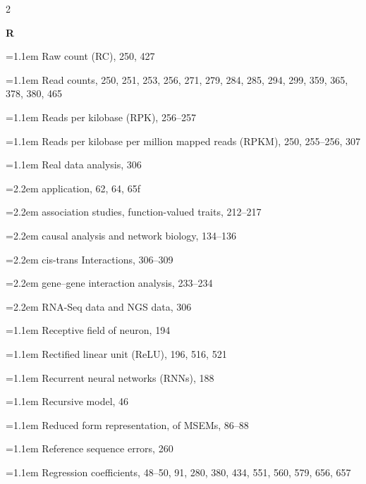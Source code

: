 \begin{multicols}{2}
\par{}\medskip\noindent\textbf{R}\par\nobreak\smallskip\nobreak
\noindent\hangindent=1.1em Raw count (RC), 250, 427\par
\noindent\hangindent=1.1em Read counts, 250, 251, 253, 256, 271, 279, 284, 285, 294, 299, 359, 365, 378, 380, 465\par
\noindent\hangindent=1.1em Reads per kilobase (RPK), 256--257\par
\noindent\hangindent=1.1em Reads per kilobase per million mapped reads (RPKM), 250, 255--256, 307\par
\noindent\hangindent=1.1em Real data analysis, 306\par
\noindent\hangindent=2.2em \hspace*{1.1em}application, 62, 64, 65f\par
\noindent\hangindent=2.2em \hspace*{1.1em}association studies, function-valued traits, 212--217\par
\noindent\hangindent=2.2em \hspace*{1.1em}causal analysis and network biology, 134--136\par
\noindent\hangindent=2.2em \hspace*{1.1em}cis-trans Interactions, 306--309\par
\noindent\hangindent=2.2em \hspace*{1.1em}gene--gene interaction analysis, 233--234\par
\noindent\hangindent=2.2em \hspace*{1.1em}RNA-Seq data and NGS data, 306\par
\noindent\hangindent=1.1em Receptive field of neuron, 194\par
\noindent\hangindent=1.1em Rectified linear unit (ReLU), 196, 516, 521\par
\noindent\hangindent=1.1em Recurrent neural networks (RNNs), 188\par
\noindent\hangindent=1.1em Recursive model, 46\par
\noindent\hangindent=1.1em Reduced form representation, of MSEMs, 86--88\par
\noindent\hangindent=1.1em Reference sequence errors, 260\par
\noindent\hangindent=1.1em Regression coefficients, 48--50, 91, 280, 380, 434, 551, 560, 579, 656, 657\par

\end{multicols}
